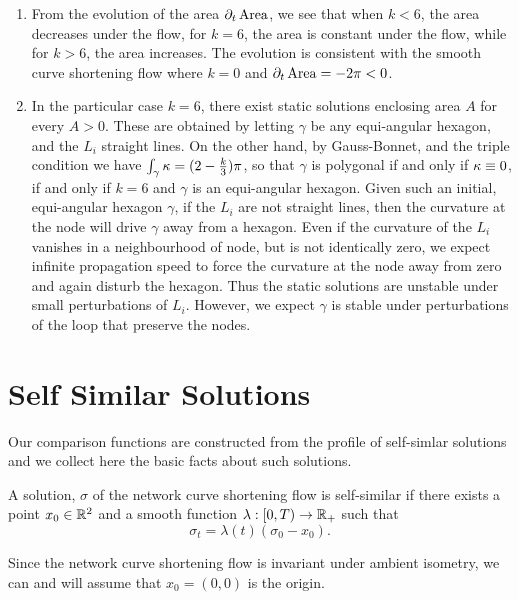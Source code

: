 \documentclass[12pt]{amsart}
\begin{document}
\begin{remark}
\begin{enumerate}
\item From the evolution of the area \(\partial_t \operatorname{Area}\), we see that when \(k < 6\), the area decreases under the flow, for \(k = 6\), the area is constant under the flow, while for \(k > 6\), the area increases. The evolution is consistent with the smooth curve shortening flow where \(k = 0\) and \(\partial_t \operatorname{Area} = - 2\pi < 0\).

\item In the particular case \(k = 6\), there exist static solutions enclosing area \(A\) for every \(A > 0\). These are obtained by letting \(\gamma\) be any equi-angular hexagon, and the \(L_i\) straight lines. On the other hand, by Gauss-Bonnet, and the triple condition we have \(\int_{\gamma} \operatorname{\kappa} = (2 - \tfrac{k}{3}) \pi\), so that \(\gamma\) is polygonal if and only if \(\operatorname{\kappa} \equiv 0\), if and only if \(k = 6\) and \(\gamma\) is an equi-angular hexagon. Given such an initial, equi-angular hexagon \(\gamma\), if the \(L_i\) are not straight lines, then the curvature at the node will drive \(\gamma\) away from a hexagon. Even if the curvature of the \(L_i\) vanishes in a neighbourhood of node, but is not identically zero, we expect infinite propagation speed to force the curvature at the node away from zero and again disturb the hexagon. Thus the static solutions are unstable under small perturbations of \(L_i\). However, we expect \(\gamma\) is stable under perturbations of the loop that preserve the nodes.

\end{enumerate}
\end{remark}

\section{Self Similar Solutions}
\label{sec:self_similar}

Our comparison functions are constructed from the profile of self-simlar solutions and we collect here the basic facts about such solutions.

\begin{defn}
\label{defn:self_simlar}
A solution, \(\sigma\) of the network curve shortening flow is self-similar if there exists a point \(x_0 \in \mathbb{R}^2\) and a smooth function \(\lambda : [0, T) \to \mathbb{R}_+\) such that
\[
\sigma_t = \lambda(t) (\sigma_0 - x_0).
\]
\end{defn}
Since the network curve shortening flow is invariant under ambient isometry, we can and will assume that \(x_0 = (0, 0)\) is the origin.
\end{document}

